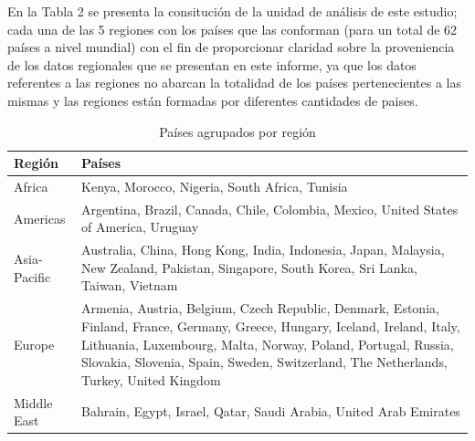 \documentclass[
]{article}
\begin{document}
\begin{multicols}{2}

En la Tabla 2 se presenta la consitución de la unidad de análisis de este estudio; cada una de las 5 regiones con los países que las conforman (para un total de 62 países a nivel mundial) con el fin de proporcionar claridad sobre la proveniencia de los datos regionales que se presentan en este informe, ya que los datos referentes a las regiones no abarcan la totalidad de los países pertenecientes a las mismas y las regiones están formadas por diferentes cantidades de paises.

\end{multicols}

\renewcommand{\arraystretch}{1.5}
\begin{footnotesize}
\begin{longtable}[t]{lp{12cm}}
\caption{\label{tab:tabla22}Países agrupados por región}\\
\toprule
Región & Países\\
\midrule
Africa & Kenya, Morocco, Nigeria, South Africa, Tunisia\\
Americas & Argentina, Brazil, Canada, Chile, Colombia, Mexico, United States of America, Uruguay\\
Asia-Pacific & Australia, China, Hong Kong, India, Indonesia, Japan, Malaysia, New Zealand, Pakistan, Singapore, South Korea, Sri Lanka, Taiwan, Vietnam\\
Europe & Armenia, Austria, Belgium, Czech Republic, Denmark, Estonia, Finland, France, Germany, Greece, Hungary, Iceland, Ireland, Italy, Lithuania, Luxembourg, Malta, Norway, Poland, Portugal, Russia, Slovakia, Slovenia, Spain, Sweden, Switzerland, The Netherlands, Turkey, United Kingdom\\
Middle East & Bahrain, Egypt, Israel, Qatar, Saudi Arabia, United Arab Emirates\\
\bottomrule
\end{longtable}

\end{footnotesize}\renewcommand{\arraystretch}{1}
\end{document}
